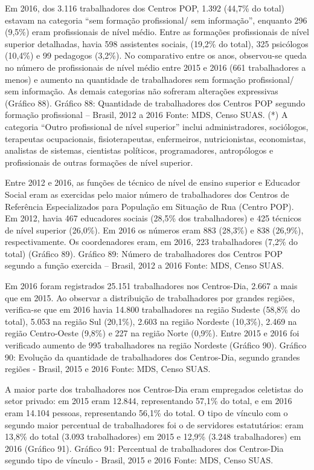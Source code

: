 \documentclass[
  brazilian]{report}
\begin{document}
Em 2016, dos 3.116 trabalhadores dos Centros POP, 1.392 (44,7\% do
total) estavam na categoria ``sem formação profissional/ sem
informação'', enquanto 296 (9,5\%) eram profissionais de nível médio.
Entre as formações profissionais de nível superior detalhadas, havia 598
assistentes sociais, (19,2\% do total), 325 psicólogos (10,4\%) e 99
pedagogos (3,2\%). No comparativo entre os anos, observou-se queda no
número de profissionais de nível médio entre 2015 e 2016 (661
trabalhadores a menos) e aumento na quantidade de trabalhadores sem
formação profissional/ sem informação. As demais categorias não sofreram
alterações expressivas (Gráfico 88). Gráfico 88: Quantidade de
trabalhadores dos Centros POP segundo formação profissional -- Brasil,
2012 a 2016 Fonte: MDS, Censo SUAS. (*) A categoria ``Outro profissional
de nível superior'' inclui administradores, sociólogos, terapeutas
ocupacionais, fisioterapeutas, enfermeiros, nutricionistas, economistas,
analistas de sistemas, cientistas políticos, programadores, antropólogos
e profissionais de outras formações de nível superior.

Entre 2012 e 2016, as funções de técnico de nível de ensino superior e
Educador Social eram as exercidas pelo maior número de trabalhadores dos
Centros de Referência Especializados para População em Situação de Rua
(Centro POP). Em 2012, havia 467 educadores sociais (28,5\% dos
trabalhadores) e 425 técnicos de nível superior (26,0\%). Em 2016 os
números eram 883 (28,3\%) e 838 (26,9\%), respectivamente. Os
coordenadores eram, em 2016, 223 trabalhadores (7,2\% do total) (Gráfico
89). Gráfico 89: Número de trabalhadores dos Centros POP segundo a
função exercida -- Brasil, 2012 a 2016 Fonte: MDS, Censo SUAS.

Em 2016 foram registrados 25.151 trabalhadores nos Centros-Dia, 2.667 a
mais que em 2015. Ao observar a distribuição de trabalhadores por
grandes regiões, verifica-se que em 2016 havia 14.800 trabalhadores na
região Sudeste (58,8\% do total), 5.053 na região Sul (20,1\%), 2.603 na
região Nordeste (10,3\%), 2.469 na região Centro-Oeste (9,8\%) e 227 na
região Norte (0,9\%). Entre 2015 e 2016 foi verificado aumento de 995
trabalhadores na região Nordeste (Gráfico 90). Gráfico 90: Evolução da
quantidade de trabalhadores dos Centros-Dia, segundo grandes regiões -
Brasil, 2015 e 2016 Fonte: MDS, Censo SUAS.

A maior parte dos trabalhadores nos Centros-Dia eram empregados
celetistas do setor privado: em 2015 eram 12.844, representando 57,1\%
do total, e em 2016 eram 14.104 pessoas, representando 56,1\% do total.
O tipo de vínculo com o segundo maior percentual de trabalhadores foi o
de servidores estatutários: eram 13,8\% do total (3.093 trabalhadores)
em 2015 e 12,9\% (3.248 trabalhadores) em 2016 (Gráfico 91). Gráfico 91:
Percentual de trabalhadores dos Centros-Dia segundo tipo de vínculo -
Brasil, 2015 e 2016 Fonte: MDS, Censo SUAS.
\end{document}
